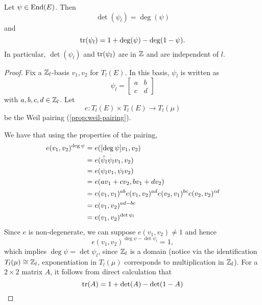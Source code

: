 
\begin{proposition}
	\label{prop:deg-tr-det}
	Let $\psi \in \operatorname{End}(E)$. Then
	\begin{equation*}
		\det(\psi_l) = \deg(\psi)
	\end{equation*}
	and
	\begin{equation*}
		\operatorname{tr}(\psi_l) = 1 + \deg(\psi) - \deg(1 - \psi).
	\end{equation*}
	In particular, $\det(\psi_l)$ and $\operatorname{tr}(\psi_l)$ are in $\mathbb{Z}$
	and are independent of $l$.
\end{proposition}

\begin{proof}
	Fix a $\mathbb{Z}_l$-basis $v_1, v_2$ for $T_l(E)$. In this basis, $\psi_l$ is
	written as 
	\begin{equation*}
		\psi_l = 
		\begin{bmatrix}
			a & b\\
			c & d
		\end{bmatrix}
	\end{equation*}
	with $a, b, c, d \in \mathbb{Z}_l$.
	Let
	\begin{equation*}
		e: T_l(E) \times T_l(E) \to T_l(\mu)
	\end{equation*}
	be the Weil pairing (\ref{prop:weil-pairing}).

	We have that using the properties of the pairing,
	\begin{align*}
		e(v_1, v_2)^{\deg\psi} &= e([\deg \psi] v_1, v_2)\\
		&= e(\Hat\psi_l\psi_l v_1, v_2)\\
		&= e(\psi_l v_1, \psi_l v_2)\\
		&= e(av_1 + cv_2, bv_1 + dv_2)\\
		&= e(v_1, v_1)^{ab}e(v_1, v_2)^{ad}e(v_2, v_1)^{bc}e(v_2, v_2)^{cd}\\
		&= e(v_1, v_2)^{ad - bc}\\
		&= e(v_1, v_2)^{\det \psi_l}
	\end{align*}
	Since $e$ is non-degenerate, we can suppose $e(v_1, v_2) \neq 1$
	and hence
	\begin{equation*}
		e(v_1, v_2)^{\deg\psi - \det\psi_l} = 1,
	\end{equation*}
	which implies $\deg\psi = \det \psi_l$, since $\mathbb{Z}_l$ is a domain
	(notice via the identification $T_l(\mu)\cong \mathbb{Z}_l$,
	exponentiation in $T_l(\mu)$ corresponds to multiplication in $\mathbb{Z}_l$).
	For a $2\times 2$ matrix $A$, it follows from direct calculation that
	\begin{equation*}
		\operatorname{tr}(A) = 1 + \det(A) - \det(1-A)
	\end{equation*}
\end{proof}
